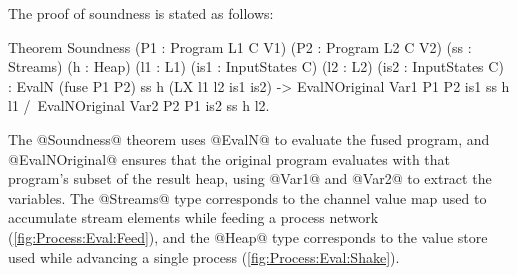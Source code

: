 The proof of soundness is stated as follows:


\begin{coq}
Theorem Soundness (P1 : Program L1 C V1) (P2  : Program L2 C V2)
                  (ss : Streams)         (h   : Heap)
                  (l1 : L1)              (is1 : InputStates C)
                  (l2 : L2)              (is2 : InputStates C)
  :  EvalN (fuse P1 P2) ss h (LX l1 l2 is1 is2)
  -> EvalNOriginal Var1 P1 P2 is1 ss h l1
  /\ EvalNOriginal Var2 P2 P1 is2 ss h l2.
\end{coq}

The @Soundness@ theorem uses @EvalN@ to evaluate the fused program, and @EvalNOriginal@ ensures that the original program evaluates with that program's subset of the result heap, using @Var1@ and @Var2@ to extract the variables.
The @Streams@ type corresponds to the channel value map used to accumulate stream elements while feeding a process network (\cref{fig:Process:Eval:Feed}), and the @Heap@ type corresponds to the value store used while advancing a single process (\cref{fig:Process:Eval:Shake}).


